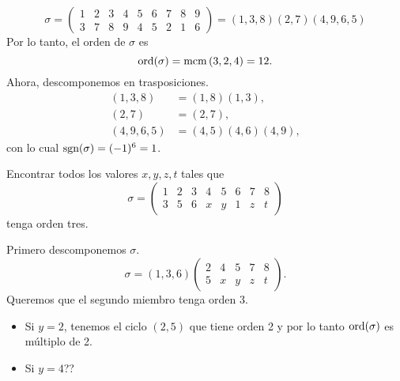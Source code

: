 \begin{ej}
    \[
        \sigma =
        \begin{pmatrix}
            1 & 2 & 3 & 4 & 5 & 6 & 7 & 8 & 9 \\
            3 & 7 & 8 & 9 & 4 & 5 & 2 & 1 & 6
        \end{pmatrix}
        = (1, 3, 8) (2, 7) (4, 9, 6, 5)
    \]
    Por lo tanto, el orden de $\sigma$ es
    \[
        \operatorname{ord}(\sigma) = \operatorname{mcm}\left( 3, 2, 4 \right) = 12.
    \]
    Ahora, descomponemos en trasposiciones.
    \[
        \begin{aligned}
            (1, 3, 8) &= (1, 8) (1, 3), \\
            (2, 7) &= (2, 7), \\
            (4, 9, 6, 5) &= (4, 5) (4, 6) (4, 9),
        \end{aligned}
    \]
    con lo cual $\text{sgn}(\sigma) = (-1)^6 = 1$.
\end{ej}

\begin{ej} %
    Encontrar todos los valores $x, y, z, t$ tales que 
    \[
        \sigma =
        \begin{pmatrix}
            1 & 2 & 3 & 4 & 5 & 6 & 7 & 8 \\
            3 & 5 & 6 & x & y & 1 & z & t
        \end{pmatrix}
    \]
    tenga orden tres.

    Primero descomponemos $\sigma$.
    \[
        \sigma = (1, 3, 6)
        \begin{pmatrix}
            2 & 4 & 5 & 7 & 8 \\
            5 & x & y & z & t
        \end{pmatrix}.
    \]
    Queremos que el segundo miembro tenga orden 3.

    \begin{itemize}
        \item Si $y = 2$, tenemos el ciclo $(2, 5)$ que tiene orden 2 y por lo tanto $\operatorname{ord}(\sigma)$
            es m\'ultiplo de 2.
        \item Si $y = 4$??%
    \end{itemize}
\end{ej}
